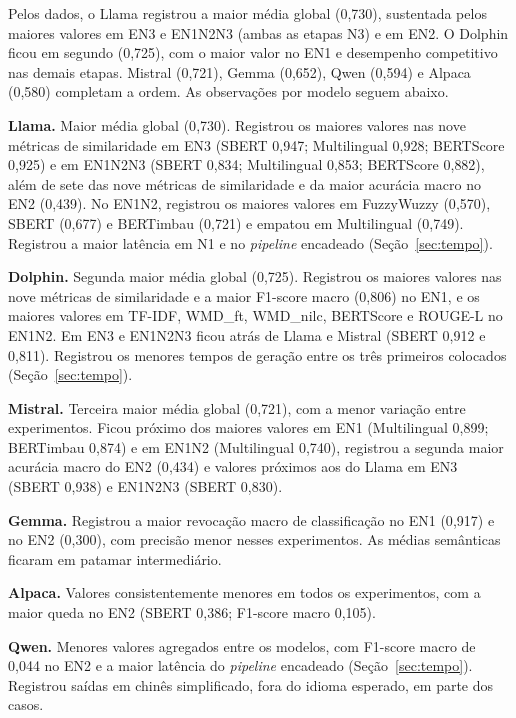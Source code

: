 Pelos dados, o Llama registrou a maior média global (0{,}730), sustentada pelos maiores valores em EN3 e EN1N2N3 (ambas as etapas N3) e em EN2. O Dolphin ficou em segundo (0{,}725), com o maior valor no EN1 e desempenho competitivo nas demais etapas. Mistral (0{,}721), Gemma (0{,}652), Qwen (0{,}594) e Alpaca (0{,}580) completam a ordem. As observações por modelo seguem abaixo.

\textbf{Llama.} Maior média global (0{,}730). Registrou os maiores valores nas nove métricas de similaridade em EN3 (SBERT 0{,}947; Multilingual 0{,}928; BERTScore 0{,}925) e em EN1N2N3 (SBERT 0{,}834; Multilingual 0{,}853; BERTScore 0{,}882), além de sete das nove métricas de similaridade e da maior acurácia macro no EN2 (0{,}439). No EN1N2, registrou os maiores valores em FuzzyWuzzy (0{,}570), SBERT (0{,}677) e BERTimbau (0{,}721) e empatou em Multilingual (0{,}749). Registrou a maior latência em N1 e no \textit{pipeline} encadeado (Seção~\ref{sec:tempo}).

\textbf{Dolphin.} Segunda maior média global (0{,}725). Registrou os maiores valores nas nove métricas de similaridade e a maior F1-score macro (0{,}806) no EN1, e os maiores valores em TF-IDF, WMD\_ft, WMD\_nilc, BERTScore e ROUGE-L no EN1N2. Em EN3 e EN1N2N3 ficou atrás de Llama e Mistral (SBERT 0{,}912 e 0{,}811). Registrou os menores tempos de geração entre os três primeiros colocados (Seção~\ref{sec:tempo}).

\textbf{Mistral.} Terceira maior média global (0{,}721), com a menor variação entre experimentos. Ficou próximo dos maiores valores em EN1 (Multilingual 0{,}899; BERTimbau 0{,}874) e em EN1N2 (Multilingual 0{,}740), registrou a segunda maior acurácia macro do EN2 (0{,}434) e valores próximos aos do Llama em EN3 (SBERT 0{,}938) e EN1N2N3 (SBERT 0{,}830).

\textbf{Gemma.} Registrou a maior revocação macro de classificação no EN1 (0{,}917) e no EN2 (0{,}300), com precisão menor nesses experimentos. As médias semânticas ficaram em patamar intermediário.

\textbf{Alpaca.} Valores consistentemente menores em todos os experimentos, com a maior queda no EN2 (SBERT 0{,}386; F1-score macro 0{,}105).

\textbf{Qwen.} Menores valores agregados entre os modelos, com F1-score macro de 0{,}044 no EN2 e a maior latência do \textit{pipeline} encadeado (Seção~\ref{sec:tempo}). Registrou saídas em chinês simplificado, fora do idioma esperado, em parte dos casos.

